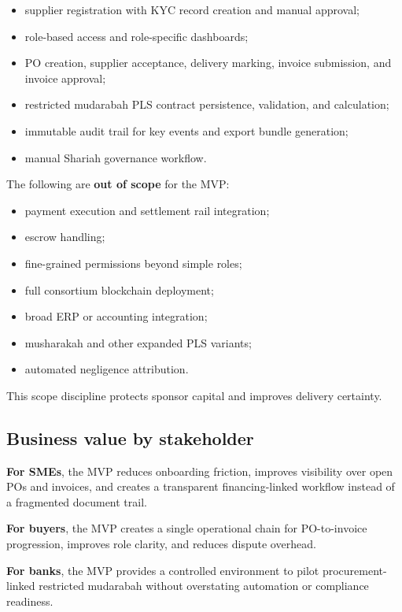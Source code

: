 \documentclass[11pt,a4paper]{article}
\begin{document}
\begin{itemize}
    \item supplier registration with KYC record creation and manual approval;
    \item role-based access and role-specific dashboards;
    \item PO creation, supplier acceptance, delivery marking, invoice submission, and invoice approval;
    \item restricted mudarabah PLS contract persistence, validation, and calculation;
    \item immutable audit trail for key events and export bundle generation;
    \item manual Shariah governance workflow.
\end{itemize}

The following are \textbf{out of scope} for the MVP:

\begin{itemize}
    \item payment execution and settlement rail integration;
    \item escrow handling;
    \item fine-grained permissions beyond simple roles;
    \item full consortium blockchain deployment;
    \item broad ERP or accounting integration;
    \item musharakah and other expanded PLS variants;
    \item automated negligence attribution.
\end{itemize}

This scope discipline protects sponsor capital and improves delivery certainty.

\subsection{Business value by stakeholder}

\textbf{For SMEs}, the MVP reduces onboarding friction, improves visibility over open POs and invoices, and creates a transparent financing-linked workflow instead of a fragmented document trail.

\textbf{For buyers}, the MVP creates a single operational chain for PO-to-invoice progression, improves role clarity, and reduces dispute overhead.

\textbf{For banks}, the MVP provides a controlled environment to pilot procurement-linked restricted mudarabah without overstating automation or compliance readiness.
\end{document}
